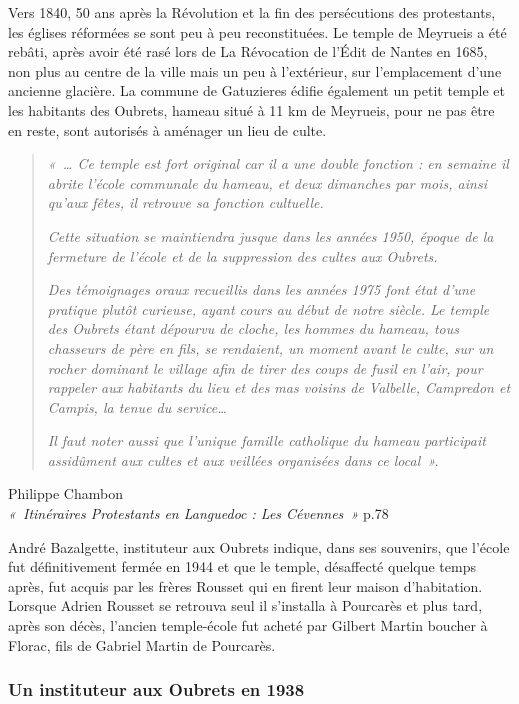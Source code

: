 Vers 1840, 50 ans après la Révolution et la fin des persécutions des protestants,
les églises réformées se sont peu à peu reconstituées. Le temple de Meyrueis a été
rebâti, après avoir été rasé lors de La Révocation de l’Édit de Nantes en 1685, non
plus au centre de la ville mais un peu à l’extérieur, sur l’emplacement d’une ancienne
glacière. La commune de Gatuzieres édifie également un petit temple et les habitants
des Oubrets, hameau situé à 11 km de Meyrueis, pour ne pas être en reste, sont
autorisés à aménager un lieu de culte.

\begin{quote}
\textit{«~… Ce temple est fort original car il a une double fonction : en semaine il
abrite l’école communale du hameau, et deux dimanches par mois, ainsi qu’aux fêtes,
il retrouve sa fonction cultuelle.}

\textit{Cette situation se maintiendra jusque dans les années 1950, époque de la fermeture
de l’école et de la suppression des cultes aux Oubrets.}

\textit{Des témoignages oraux recueillis dans les années 1975 font état d’une pratique
plutôt curieuse, ayant cours au début de notre siècle. Le temple des Oubrets étant
dépourvu de cloche, les hommes du hameau, tous chasseurs de père en fils, se
rendaient, un moment avant le culte, sur un rocher dominant le village afin de tirer
des coups de fusil en l’air, pour rappeler aux habitants du lieu et des mas voisins de
Valbelle, Campredon et Campis, la tenue du service…}

\textit{Il faut noter aussi que l’unique famille catholique du hameau participait assidûment
aux cultes et aux veillées organisées dans ce local~».}
\end{quote}

\begin{flushright}
Philippe Chambon\\
\textit{«~Itinéraires Protestants en Languedoc : Les Cévennes~»} p.78
\end{flushright}

André Bazalgette, instituteur aux Oubrets indique, dans ses souvenirs, que l’école fut
définitivement fermée en 1944 et que le temple, désaffecté quelque temps après, fut acquis
par les frères Rousset qui en firent leur maison d’habitation. Lorsque Adrien Rousset se
retrouva seul il s’installa à Pourcarès et plus tard, après son décès, l’ancien temple-école fut
acheté par Gilbert Martin boucher à Florac, fils de Gabriel Martin de Pourcarès.

\subsubsection{Un instituteur aux Oubrets en 1938}

